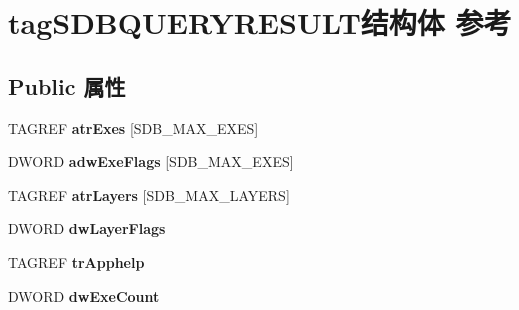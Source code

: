\hypertarget{structtag_s_d_b_q_u_e_r_y_r_e_s_u_l_t}{}\section{tag\+S\+D\+B\+Q\+U\+E\+R\+Y\+R\+E\+S\+U\+L\+T结构体 参考}
\label{structtag_s_d_b_q_u_e_r_y_r_e_s_u_l_t}
\subsection*{Public 属性}
\begin{DoxyCompactItemize}
\item 
\mbox{\label{structtag_s_d_b_q_u_e_r_y_r_e_s_u_l_t_af2bd1ef3bdc73259cfc6e46fd1af1954}} 
T\+A\+G\+R\+EF {\bfseries atr\+Exes} \mbox{[}S\+D\+B\+\_\+\+M\+A\+X\+\_\+\+E\+X\+ES\mbox{]}
\item 
\mbox{\label{structtag_s_d_b_q_u_e_r_y_r_e_s_u_l_t_a82115f8bfaa41f48aa901df35da9430e}} 
D\+W\+O\+RD {\bfseries adw\+Exe\+Flags} \mbox{[}S\+D\+B\+\_\+\+M\+A\+X\+\_\+\+E\+X\+ES\mbox{]}
\item 
\mbox{\label{structtag_s_d_b_q_u_e_r_y_r_e_s_u_l_t_a38174f43f7accab66e3bf5ac3ae855cf}} 
T\+A\+G\+R\+EF {\bfseries atr\+Layers} \mbox{[}S\+D\+B\+\_\+\+M\+A\+X\+\_\+\+L\+A\+Y\+E\+RS\mbox{]}
\item 
\mbox{\label{structtag_s_d_b_q_u_e_r_y_r_e_s_u_l_t_af79e9781d85e7dabd43156eb8e3825c3}} 
D\+W\+O\+RD {\bfseries dw\+Layer\+Flags}
\item 
\mbox{\label{structtag_s_d_b_q_u_e_r_y_r_e_s_u_l_t_afb75664e156501877618e49e3da16474}} 
T\+A\+G\+R\+EF {\bfseries tr\+Apphelp}
\item 
\mbox{\label{structtag_s_d_b_q_u_e_r_y_r_e_s_u_l_t_a578bc3435de4b658bbcd5b01d0facfa0}} 
D\+W\+O\+RD {\bfseries dw\+Exe\+Count}
\item 
\mbox{\label{structtag_s_d_b_q_u_e_r_y_r_e_s_u_l_t_a15f10b5e418bc392b3707666f81b14fc}} 

\end{DoxyCompactItemize}
